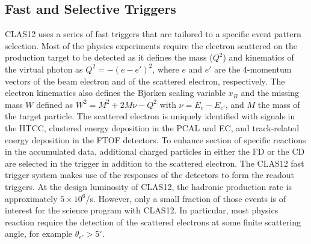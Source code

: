 \documentclass[final,3p,twocolumn]{elsarticle}
\begin{document}
\subsection{Fast and Selective Triggers} 

CLAS12 uses a series of fast triggers that are tailored to a specific event pattern selection. Most of the physics
experiments require the electron scattered on the production target to be detected as it defines the mass
($Q^2$) and kinematics of the virtual photon as $Q^2 = -(e - e')^2$, where $e$ and $e'$ are the 4-momentum
vectors of the beam electron and of the scattered electron, respectively. The electron kinematics also defines
the Bjorken scaling variable $x_B$  and the missing mass $W$ defined as $W^2 = M^2 + 2M\nu - Q^2$ with
$\nu = E_e - E_{e'}$, and $M$ the mass of the target particle. The scattered electron is uniquely identified with
signals in the HTCC, clustered energy deposition  in the PCAL and EC, and track-related energy deposition in the
FTOF detectors. To enhance section of specific reactions in the accumulated data, additional charged particles
in either the FD or the CD are selected in the trigger in addition to the scattered electron. The CLAS12 fast
trigger system makes use of the responses of the detectors to form the readout triggers. At the design
luminosity of CLAS12, the hadronic production rate is approximately $5 \times 10^6$/s. However, only a small
fraction of those events is of interest for the science program with CLAS12. In particular, most physics reaction
require the detection of the scattered electrons at some finite scattering angle, for example $\theta_{e'} > 5^\circ$.  
   
\end{document}
